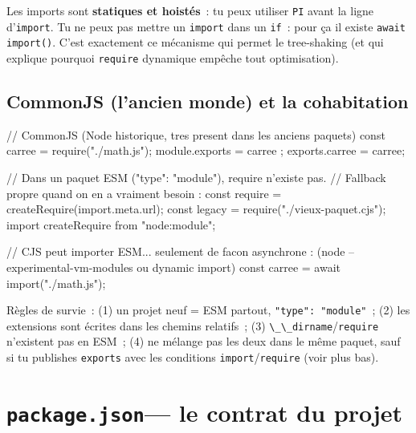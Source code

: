 \begin{note}
Les imports sont \textbf{statiques et hoist\'es}~: tu peux utiliser \texttt{PI} avant la ligne
d'\texttt{import}. Tu ne peux pas mettre un \texttt{import} dans un \texttt{if}~: pour \c{c}a il
existe \texttt{await import()}. C'est exactement ce m\'ecanisme qui permet le tree-shaking
(et qui explique pourquoi \texttt{require} dynamique emp\^eche tout optimisation).
\end{note}

\subsection{CommonJS (l'ancien monde) et la cohabitation}

\begin{codejs}
// CommonJS (Node historique, tres present dans les anciens paquets)
const { carree } = require("./math.js");
module.exports = { carree };
exports.carree = carree;

// Dans un paquet ESM ("type": "module"), require n'existe pas.
// Fallback propre quand on en a vraiment besoin :
const require = createRequire(import.meta.url);
const legacy = require("./vieux-paquet.cjs");
import { createRequire } from "node:module";

// CJS peut importer ESM... seulement de facon asynchrone : (node --experimental-vm-modules ou dynamic import)
const { carree } = await import("./math.js");
\end{codejs}

R\`egles de survie~: (1) un projet neuf = ESM partout, \verb|"type": "module"|~;
(2) les extensions sont \'ecrites dans les chemins relatifs~;
(3) \verb|\_\_dirname|/\verb|require| n'existent pas en ESM~;
(4) ne m\'elange pas les deux dans le m\^eme paquet, sauf si tu publishes
\verb|exports| avec les conditions \verb|import|/\verb|require| (voir plus bas).

\section{\texttt{package.json}--- le contrat du projet}

